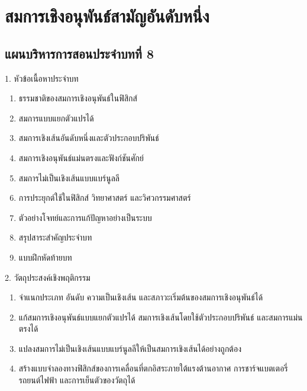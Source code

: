 \chapter{สมการเชิงอนุพันธ์สามัญอันดับหนึ่ง}

\section*{แผนบริหารการสอนประจำบทที่ 8}

\begin{planbox}[colframe=rbruNavy, colbacktitle=rbruNavy]{1. หัวข้อเนื้อหาประจำบท}
\begin{enumerate}[topsep=2pt, itemsep=1pt, partopsep=0pt, parsep=0pt, leftmargin=1.5em]
    \item ธรรมชาติของสมการเชิงอนุพันธ์ในฟิสิกส์
    \item สมการแบบแยกตัวแปรได้
    \item สมการเชิงเส้นอันดับหนึ่งและตัวประกอบปริพันธ์
    \item สมการเชิงอนุพันธ์แม่นตรงและฟังก์ชันศักย์
    \item สมการไม่เป็นเชิงเส้นแบบแบร์นูลลี
    \item การประยุกต์ใช้ในฟิสิกส์ วิทยาศาสตร์ และวิศวกรรมศาสตร์
    \item ตัวอย่างโจทย์และการแก้ปัญหาอย่างเป็นระบบ
    \item สรุปสาระสำคัญประจำบท
    \item แบบฝึกหัดท้ายบท
\end{enumerate}
\end{planbox}

\begin{planbox}[colframe=rbruGreen, colbacktitle=rbruGreen]{2. วัตถุประสงค์เชิงพฤติกรรม}
\begin{enumerate}[topsep=2pt, itemsep=1pt, partopsep=0pt, parsep=0pt, leftmargin=1.5em]
    \item จำแนกประเภท อันดับ ความเป็นเชิงเส้น และสภาวะเริ่มต้นของสมการเชิงอนุพันธ์ได้
    \item แก้สมการเชิงอนุพันธ์แบบแยกตัวแปรได้ สมการเชิงเส้นโดยใช้ตัวประกอบปริพันธ์ และสมการแม่นตรงได้
    \item แปลงสมการไม่เป็นเชิงเส้นแบบแบร์นูลลีให้เป็นสมการเชิงเส้นได้อย่างถูกต้อง
    \item สร้างแบบจำลองทางฟิสิกส์ของการเคลื่อนที่ตกอิสระภายใต้แรงต้านอากาศ การชาร์จแบตเตอรี่รถยนต์ไฟฟ้า และการเย็นตัวของวัตถุได้
\end{enumerate}
\end{planbox}

